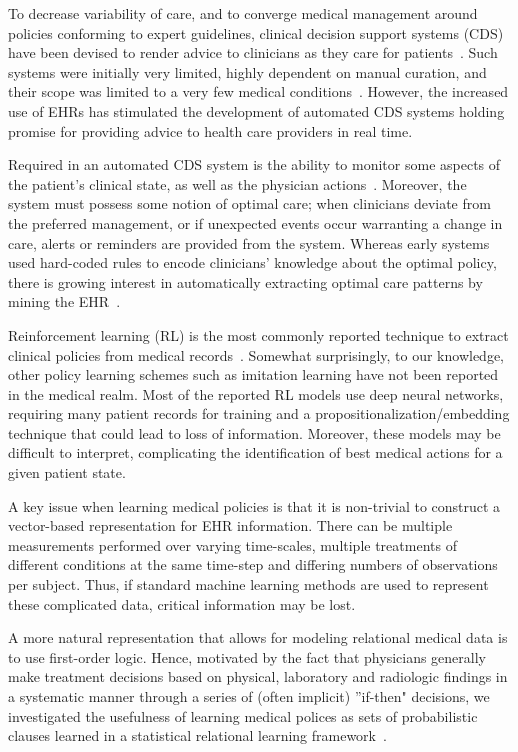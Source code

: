 \documentclass[letterpaper]{article} %
\begin{document}
To decrease variability of care, and to converge medical management around policies conforming to expert guidelines, clinical decision support systems (CDS) have been devised to render advice to clinicians as they care for patients~\cite{osheroff2007roadmap}. Such systems were initially very limited, highly dependent on manual curation, and their scope was limited to a very few medical conditions~\cite{middleton2016clinical}. However, the increased use of EHRs has stimulated the development of automated CDS systems holding promise for providing advice to health care providers in real time.

Required in an automated CDS system is the ability to monitor some aspects of the patient's clinical state, as well as the physician actions~\cite{middleton2016clinical}. Moreover, the system must possess some notion of optimal care; when clinicians deviate from the preferred management, or if unexpected events occur warranting a change in care, alerts or reminders are provided from the system. Whereas early systems used hard-coded rules to encode clinicians' knowledge about the optimal policy, there is growing interest in automatically extracting optimal care patterns by mining the EHR~\cite{ohno2016using}.

Reinforcement learning (RL) is the most commonly reported technique to extract clinical policies from medical records~\cite{komorowski2018artificial,raghu2017continuous}. Somewhat surprisingly, to our knowledge, other policy learning schemes such as imitation learning have not been reported in the medical realm. Most of the reported RL models use deep neural networks, requiring many patient records for training and a propositionalization/embedding technique that could lead to loss of information.  Moreover, these models may be difficult to interpret, complicating the identification of best medical actions for a given patient state. %

A key issue when learning medical policies is that it is non-trivial to construct a vector-based representation for EHR information. There can be multiple measurements performed over varying time-scales, multiple treatments of different conditions at the same time-step and differing numbers of observations per subject. Thus, if standard machine learning methods are used to represent these complicated data, critical information may be lost.

A more natural representation that allows for modeling relational medical data is to use first-order logic. Hence, motivated by the fact that physicians generally make treatment decisions based on physical, laboratory and radiologic findings in a systematic manner through a series of (often implicit) ''if-then" decisions, we investigated the usefulness of learning medical polices as sets of probabilistic clauses learned in a statistical relational learning framework~\cite{de2008probabilistic,raedt2016statistical}.%
\end{document}

